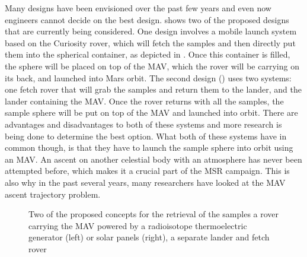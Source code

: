 Many designs have been envisioned over the past few years and even now engineers cannot decide on the best design. \cite{shotwell2016drivers} shows two of the proposed designs that are currently being considered. One design involves a mobile launch system based on the Curiosity rover, which will fetch the samples and then directly put them into the spherical container, as depicted in . Once this container is filled, the sphere will be placed on top of the \ac{MAV}, which the rover will be carrying on its back, and launched into Mars orbit. The second design () uses two systems: one fetch rover that will grab the samples and return them to the lander, and the lander containing the \ac{MAV}. Once the rover returns with all the samples, the sample sphere will be put on top of the \ac{MAV} and launched into orbit. There are advantages and disadvantages to both of these systems and more research is being done to determine the best option. What both of these systems have in common though, is that they have to launch the sample sphere into orbit using an \ac{MAV}. An ascent on another celestial body with an atmosphere has never been attempted before, which makes it a crucial part of the \ac{MSR} campaign. This is also why in the past several years, many researchers have looked at the \ac{MAV} ascent trajectory problem. 

\begin{figure}[H]
\centering
{}
\caption{Two of the proposed concepts for the retrieval of the samples   \protect{} a rover carrying the \ac{MAV} powered by a radioisotope thermoelectric generator (left) or solar panels (right), \protect{} a separate lander and fetch rover \citep{shotwell2016drivers} } 
\label{fig:launch_rover_shotwell2016drivers} 
\end{figure} 

